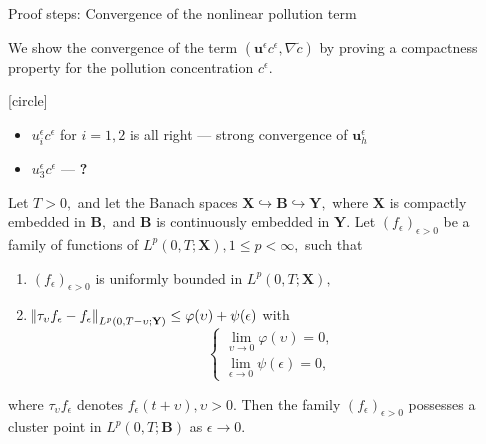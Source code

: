 \documentclass{beamer}
\begin{document}
\begin{frame}{Proof steps: Convergence of the nonlinear pollution term}

We show the convergence of the term $(\mathbf{u}^\epsilon c^\epsilon, \nabla \tilde{c})$ by proving a compactness property for the pollution concentration $c^\epsilon.$

[circle]
\begin{itemize}

\item $u^\epsilon_i c^\epsilon$ for $i = 1,2$ is all right --- strong convergence of $\mathbf{u}^\epsilon_h$

\end{itemize}

\begin{itemize}
\item \textcolor{mediumred-violet}{$u^\epsilon_3 c^\epsilon$} --- \textbf{?}

\end{itemize}

\end{frame}

\begin{frame}
\vspace{-0.6cm}
\begin{theorem}
Let $T>0,$ and let the Banach spaces $\mathbf{X} \hookrightarrow \mathbf{B} \hookrightarrow \mathbf{Y},$ where $\mathbf{X}$ is compactly embedded in $\mathbf{B},$ and $\mathbf{B}$ is continuously embedded in $\mathbf{Y}.$ Let $(f_\epsilon)_{\epsilon>0}$ be a family of functions of $L^p (0,T; \mathbf{X}), 1 \leq p < \infty,$ such that
\begin{enumerate}
  \item $(f_\epsilon)_{\epsilon>0}$ is uniformly bounded in $L^p (0,T; \mathbf{X}),$
  \item $\norm{\tau_\upsilon f_\epsilon - f_\epsilon}_{L^p(0,T-\upsilon; \mathbf{Y})} \leq \varphi(\upsilon) + \psi(\epsilon)$ with
  $$
    \begin{cases}
      \lim_{\upsilon \to 0} \varphi(\upsilon) = 0,\\
      \lim_{\epsilon \to 0} \psi(\epsilon) = 0,
    \end{cases}
  $$
  \end{enumerate}
  
where $\tau_\upsilon f_\epsilon$ denotes $f_\epsilon (t+\upsilon), \upsilon > 0.$ Then the family $(f_\epsilon)_{\epsilon>0}$ possesses a cluster point in $L^p (0,T; \mathbf{B})$ as $\epsilon \to 0.$
\end{theorem}
\end{frame}
\end{document}
